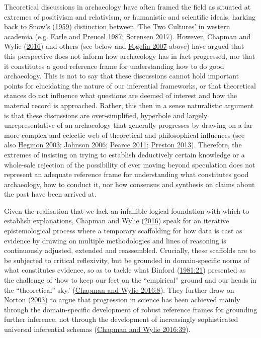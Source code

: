 \documentclass[
  12pt,
  a4paper,
  oneside]{book}
\begin{document}
Theoretical discussions in archaeology have often framed the field as situated at extremes of positivism and relativism, or humanistic and scientific ideals, harking back to Snow's (\protect\hyperlink{ref-snow1959}{1959}) distinction between `The Two Cultures' in western academia (e.g. \protect\hyperlink{ref-earle1987}{Earle and Preucel 1987}; \protect\hyperlink{ref-suxf8rensen2017}{Sørensen 2017}). However, Chapman and Wylie (\protect\hyperlink{ref-chapman2016}{2016}) and others (see below and \protect\hyperlink{ref-fogelin2007}{Fogelin 2007} above) have argued that this perspective does not inform how archaeology has in fact progressed, nor that it constitutes a good reference frame for understanding how to do good archaeology. This is not to say that these discussions cannot hold important points for elucidating the nature of our inferential frameworks, or that theoretical stances do not influence what questions are deemed of interest and how the material record is approached. Rather, this then in a sense naturalistic argument is that these discussions are over-simplified, hyperbole and largely unrepresentative of an archaeology that generally progresses by drawing on a far more complex and eclectic web of theoretical and philosophical influences (see also \protect\hyperlink{ref-hegmon2003}{Hegmon 2003}; \protect\hyperlink{ref-johnson2006}{Johnson 2006}; \protect\hyperlink{ref-pearce2011}{Pearce 2011}; \protect\hyperlink{ref-preston2013}{Preston 2013}). Therefore, the extremes of insisting on trying to establish deductively certain knowledge or a whole-sale rejection of the possibility of ever moving beyond speculation does not represent an adequate reference frame for understanding what constitutes good archaeology, how to conduct it, nor how consensus and synthesis on claims about the past have been arrived at.

Given the realisation that we lack an infallible logical foundation with which to establish explanations, Chapman and Wylie (\protect\hyperlink{ref-chapman2016}{2016}) speak for an iterative epistemological process where a temporary scaffolding for how data is cast as evidence by drawing on multiple methodologies and lines of reasoning is continuously adjusted, extended and reassembled. Crucially, these scaffolds are to be subjected to critical reflexivity, but be grounded in domain-specific norms of what constitutes evidence, so as to tackle what Binford (\protect\hyperlink{ref-binford1981}{1981:21}) presented as the challenge of `how to keep our feet on the ``empirical'' ground and our heads in the ``theoretical'' sky.' (\protect\hyperlink{ref-chapman2016}{Chapman and Wylie 2016:8}). They further draw on Norton (\protect\hyperlink{ref-norton2003}{2003}) to argue that progression in science has been achieved mainly through the domain-specific development of robust reference frames for grounding further inference, not through the development of increasingly sophisticated universal inferential schemas (\protect\hyperlink{ref-chapman2016}{Chapman and Wylie 2016:39}).
\end{document}
